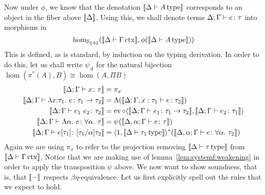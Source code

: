 Now under $\phi$, we know that the denotation
$\llbracket \Delta \vdash A\,\mathrm{type} \rrbracket$ corresponds to an object in the fiber
above $\llbracket \Delta \rrbracket$. Using this, we shall denote terms
$\Delta; \Gamma \vdash e \colon \tau$ into morphisms in
\[
  \hom_{\mathbb{E}_{\llbracket \Delta \rrbracket}}(\llbracket \Delta \vdash \Gamma\,\mathrm{ctx} \rrbracket, \phi(\llbracket \Delta \vdash A\,\mathrm{type} \rrbracket))
\]
This is defined, as is standard, by induction on the typing
derivation. In order to do this, let us shall write $\psi_A$ for the
natural bijection $\hom(\pi^*(A), B) \cong \hom(A, \Pi B)$
\begin{align*}
  \llbracket \Delta; \Gamma \vdash x \colon \tau \rrbracket &= \pi_x\\
  \llbracket \Delta; \Gamma \vdash \lambda x \mathord{:} \tau_1.\ e \colon \tau_1 \to \tau_2 \rrbracket &=
  \Lambda(\llbracket \Delta; \Gamma, x : \tau_1 \vdash e \colon \tau_2 \rrbracket)\\
  \llbracket \Delta; \Gamma \vdash e_1\ e_2 \colon \tau_2 \rrbracket &=
  \operatorname{ev} \circ
  \langle \llbracket \Delta; \Gamma \vdash e_1 \colon \tau_1 \to \tau_2 \rrbracket, \llbracket \Delta; \Gamma \vdash e_2 \colon \tau_1 \rrbracket \rangle\\
  \llbracket \Delta; \Gamma \vdash \Lambda \alpha.\ e \colon \forall \alpha.\ \tau \rrbracket &=
  \psi(\llbracket \Delta, \alpha; \Gamma \vdash e \colon \tau \rrbracket)\\
  \llbracket \Delta; \Gamma \vdash e[\tau_1] \colon [\tau_1/\alpha]\tau_2 \rrbracket &=
  \langle 1, \llbracket \Delta \vdash \tau_1\,\mathrm{type} \rrbracket\rangle^*(\llbracket \Delta, \alpha; \Gamma \vdash e \colon \forall \alpha.\ \tau_2 \rrbracket)
\end{align*}
Again we are using $\pi_x$ to refer to the projection removing
$\llbracket \Delta \vdash \tau\,\mathrm{type} \rrbracket$ from
$\llbracket \Delta \vdash \Gamma\,\mathrm{ctx} \rrbracket$. Notice that we are making use of
lemma~\ref{lem:systemf:weakening} in order to apply the transposition
$\psi$ above. We now want to show soundness, that is, that
$\llbracket - \rrbracket$ respects $\beta\eta$-equivalence. Let us first explicitly
spell out the rules that we expect to hold.
